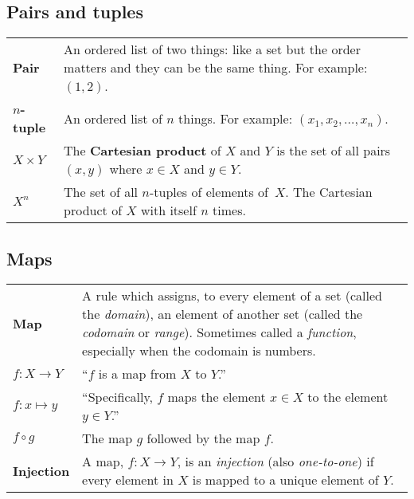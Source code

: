 \documentclass[10pt, a4paper, landscape]{article}
\newcommand{\defn}[1]{\textbf{#1}}
\begin{document}
\begin{multicols*}{3}
\subsection*{Pairs and tuples}
\begin{tabularx}{\columnwidth}{@{}l>{\raggedright\arraybackslash}X@{}}
  \toprule
  \defn{Pair} & An ordered list of two things: like a set but the order matters and they can be the same thing. For example: $(1, 2)$. \\
  
  \defn{$n$-tuple} & An ordered list of $n$ things. For example: $(x_1, x_2,\dotsc, x_n)$. \\

  $X\times Y$      & The \defn{Cartesian product} of $X$ and $Y$ is the set
  of all pairs $(x,y)$ where $x \in X$ and $y \in Y$. \\

  $X^n$ & The set of all $n$-tuples of elements of~$X$. The Cartesian product of $X$ with itself $n$ times. \\

\end{tabularx}


\subsection*{Maps}
\begin{tabularx}{\columnwidth}{@{}l>{\raggedright\arraybackslash}X@{}}
  \toprule
  \defn{Map} & A rule which assigns, to every element of a set (called the \emph{domain}), an element of another set (called the \emph{codomain} or \emph{range}). Sometimes called a \emph{function}, especially when the codomain is numbers. \\

  $f\colon X\to Y$   & ``$f$ is a map from $X$ to $Y$.'' \\

  $f\colon x \mapsto y$  & ``Specifically, $f$ maps the element $x \in X$ to the
  element $y \in Y$.'' \\
  $f \circ g$    & The map $g$ followed by the map $f$. \\

  \defn{Injection} & A map, $f\colon X \to Y$, is an \emph{injection} (also \emph{one-to-one}) if every element in $X$ is mapped to a unique element of $Y$. \\


\end{tabularx}
\end{multicols*}
\end{document}
